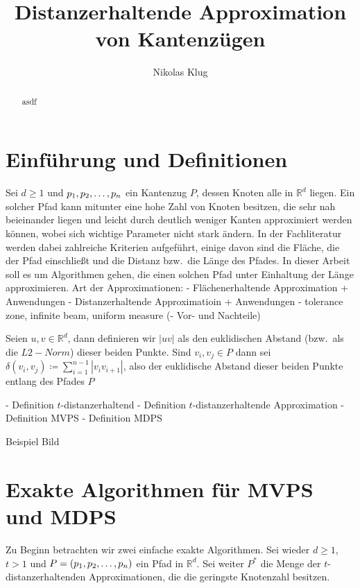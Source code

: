 \documentclass[11pt]{article}
\title{Distanzerhaltende Approximation von Kantenzügen}
\author{Nikolas Klug}
\newcommand{\R}{\mathbb{R}}
\newcommand{\n}{\newline}
\begin{document}
    \maketitle

    \begin{abstract}
        asdf
    \end{abstract}

    \section{Einführung und Definitionen}
    \label{sec:intro}

    Sei $d\geq1$ und $p_1, p_2, \mathellipsis, p_n$ ein Kantenzug $P$, dessen Knoten alle in $\R^{d}$ liegen.
    Ein solcher Pfad kann mitunter eine hohe Zahl von Knoten besitzen, die sehr nah beieinander liegen und leicht durch deutlich weniger Kanten approximiert werden können, wobei sich wichtige Parameter nicht stark ändern. In der Fachliteratur werden dabei zahlreiche Kriterien aufgeführt, einige davon sind die Fläche, die der Pfad einschließt und die Distanz bzw.\ die Länge des Pfades. In dieser Arbeit soll es um Algorithmen gehen, die einen solchen Pfad unter Einhaltung der Länge approximieren.
    Art der Approximationen:
    - Flächenerhaltende Approximation + Anwendungen\n
    - Distanzerhaltende Approximatioin + Anwendungen\n
    - tolerance zone, infinite beam, uniform measure\textellipsis\n
    (- Vor- und Nachteile)


    Seien $u, v \in \R^d$, dann definieren wir $|uv|$ als den euklidischen Abstand
    (bzw.\ als die $L2-Norm$) dieser beiden Punkte.
    Sind $v_i, v_j \in P$ dann sei $\delta(v_i, v_j) \coloneqq \sum\limits_{i=1}^{n-1}{|v_i
    v_{i+1}|}$, also der euklidische Abstand dieser beiden Punkte entlang des Pfades $P$

    - Definition $t$-distanzerhaltend\n
    - Definition $t$-distanzerhaltende Approximation\n
    - Definition MVPS\n
    - Definition MDPS\n

    Beispiel Bild

    \section{Exakte Algorithmen für MVPS und MDPS}
    \label{sec:exact}
    
    Zu Beginn betrachten wir zwei einfache exakte Algorithmen.
    Sei wieder $d\geq1$, $t>1$ und $P = (p_1, p_2, \mathellipsis, p_n)$ ein Pfad in $\R^d$. Sei weiter $P^*$ die Menge der $t$-distanzerhaltenden Approximationen, die die geringste Knotenzahl besitzen.
    
\end{document}
